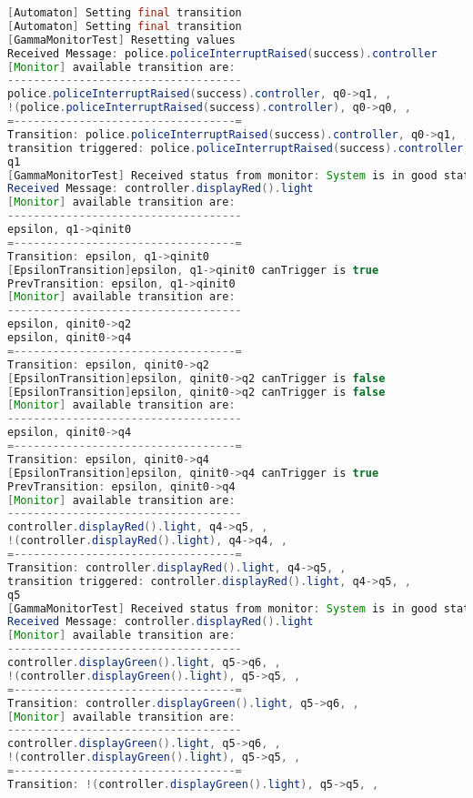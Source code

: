 \begin{lstlisting}[language=java, caption={\textit{Gamma} monitor kimenet rendőrségi példa.},captionpos=b,label=gamma_monitor_output2]
[Automaton] Setting final transition
[Automaton] Setting final transition
[GammaMonitorTest] Resetting values
Received Message: police.policeInterruptRaised(success).controller
[Monitor] available transition are:
------------------------------------
police.policeInterruptRaised(success).controller, q0->q1, ,
!(police.policeInterruptRaised(success).controller), q0->q0, ,
=----------------------------------=
Transition: police.policeInterruptRaised(success).controller, q0->q1, ,
transition triggered: police.policeInterruptRaised(success).controller, q0->q1, ,
q1
[GammaMonitorTest] Received status from monitor: System is in good state.
Received Message: controller.displayRed().light
[Monitor] available transition are:
------------------------------------
epsilon, q1->qinit0
=----------------------------------=
Transition: epsilon, q1->qinit0
[EpsilonTransition]epsilon, q1->qinit0 canTrigger is true
PrevTransition: epsilon, q1->qinit0
[Monitor] available transition are:
------------------------------------
epsilon, qinit0->q2
epsilon, qinit0->q4
=----------------------------------=
Transition: epsilon, qinit0->q2
[EpsilonTransition]epsilon, qinit0->q2 canTrigger is false
[EpsilonTransition]epsilon, qinit0->q2 canTrigger is false
[Monitor] available transition are:
------------------------------------
epsilon, qinit0->q4
=----------------------------------=
Transition: epsilon, qinit0->q4
[EpsilonTransition]epsilon, qinit0->q4 canTrigger is true
PrevTransition: epsilon, qinit0->q4
[Monitor] available transition are:
------------------------------------
controller.displayRed().light, q4->q5, ,
!(controller.displayRed().light), q4->q4, ,
=----------------------------------=
Transition: controller.displayRed().light, q4->q5, ,
transition triggered: controller.displayRed().light, q4->q5, ,
q5
[GammaMonitorTest] Received status from monitor: System is in good state.
Received Message: controller.displayRed().light
[Monitor] available transition are:
------------------------------------
controller.displayGreen().light, q5->q6, ,
!(controller.displayGreen().light), q5->q5, ,
=----------------------------------=
Transition: controller.displayGreen().light, q5->q6, ,
[Monitor] available transition are:
------------------------------------
controller.displayGreen().light, q5->q6, ,
!(controller.displayGreen().light), q5->q5, ,
=----------------------------------=
Transition: !(controller.displayGreen().light), q5->q5, ,

\end{lstlisting}
